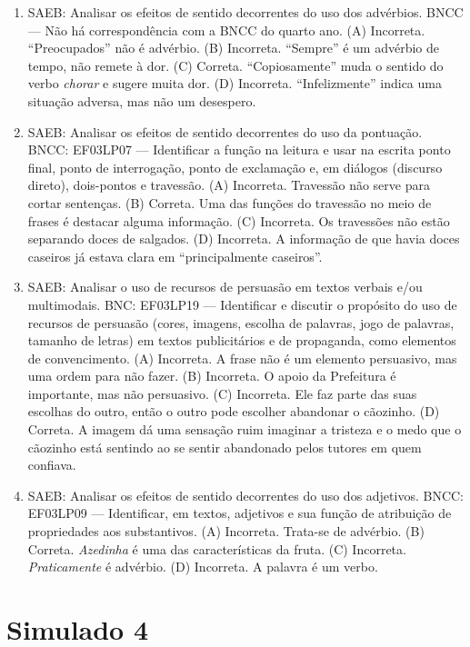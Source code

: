 \begin{enumerate}
\item
SAEB: Analisar os efeitos de sentido decorrentes do uso dos advérbios. BNCC --- Não há correspondência com a BNCC do quarto ano. 
(A) Incorreta. ``Preocupados'' não é advérbio. 
(B) Incorreta. ``Sempre'' é um advérbio de tempo, não remete à dor. 
(C) Correta. ``Copiosamente'' muda o sentido do verbo \emph{chorar} e sugere muita dor.
(D) Incorreta. ``Infelizmente'' indica uma situação adversa, mas não um desespero.

\item
SAEB: Analisar os efeitos de sentido decorrentes do uso da pontuação. 
BNCC: EF03LP07 --- Identificar a função na leitura e usar na escrita ponto final, ponto de interrogação, ponto de exclamação e, em diálogos (discurso direto), dois-pontos e travessão.
(A) Incorreta. Travessão não serve para cortar sentenças. 
(B) Correta. Uma das funções do travessão no meio de frases é destacar alguma informação. 
(C) Incorreta. Os travessões não estão separando doces de salgados. 
(D) Incorreta. A informação de que havia doces caseiros já estava clara em ``principalmente caseiros''.

\item
SAEB: Analisar o uso de recursos de persuasão em textos verbais e/ou multimodais. 
BNC: EF03LP19 --- Identificar e discutir o propósito do uso de recursos de persuasão (cores, imagens, escolha de palavras, jogo de palavras, tamanho de letras) em textos publicitários e de propaganda, como elementos de convencimento. 
(A) Incorreta. A frase não é um elemento persuasivo, mas uma ordem para não fazer. 
(B) Incorreta. O apoio da Prefeitura é importante, mas não persuasivo. 
(C) Incorreta. Ele faz parte das suas escolhas do outro, então o outro pode escolher abandonar o cãozinho. 
(D) Correta. A imagem dá uma sensação ruim imaginar a tristeza e o medo que o cãozinho está sentindo ao se sentir abandonado pelos tutores em quem confiava.

\item
SAEB: Analisar os efeitos de sentido decorrentes do uso dos adjetivos. 
BNCC: EF03LP09 --- Identificar, em textos, adjetivos e sua função de atribuição de propriedades aos substantivos. 
(A) Incorreta. Trata-se de advérbio. 
(B) Correta. \emph{Azedinha} é uma das características da fruta. 
(C) Incorreta. \emph{Praticamente} é advérbio. 
(D) Incorreta. A palavra é um verbo.
\end{enumerate}

\section*{Simulado 4}

